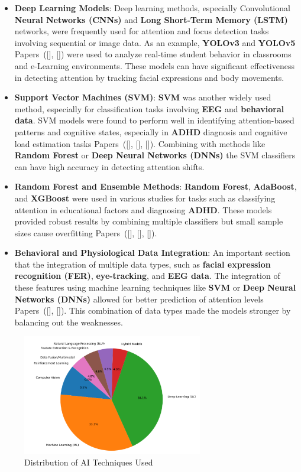 \documentclass[12pt]{article}
\begin{document}
\begin{itemize}
    \item \textbf{Deep Learning Models}: Deep learning methods, especially Convolutional \textbf{Neural Networks (CNNs)} and \textbf{Long Short-Term Memory (LSTM)} networks, were frequently used for attention and focus detection tasks involving sequential or image data. As an example, \textbf{YOLOv3} and \textbf{YOLOv5} Papers~([\citealp{ref1}], [\citealp{ref8}]) were used to analyze real-time student behavior in classrooms and e-Learning environments. These models can have significant effectiveness in detecting attention by tracking facial expressions and body movements.
    \item \textbf{Support Vector Machines (SVM)}: \textbf{SVM} was another widely used method, especially for classification tasks involving \textbf{EEG} and \textbf{behavioral data}. SVM models were found to perform well in identifying attention-based patterns and cognitive states, especially in \textbf{ADHD} diagnosis and cognitive load estimation tasks Papers~([\citealp{ref11}], [\citealp{ref12}], [\citealp{ref19}]). Combining with methods like \textbf{Random Forest} or \textbf{Deep Neural Networks (DNNs)} the SVM classifiers can have high accuracy in detecting attention shifts.
    \item \textbf{Random Forest and Ensemble Methods}: \textbf{Random Forest}, \textbf{AdaBoost}, and \textbf{XGBoost} were used in various studies for tasks such as classifying attention in educational factors and diagnosing \textbf{ADHD}. These models provided robust results by combining multiple classifiers but small sample sizes cause overfitting Papers~([\citealp{ref2}], [\citealp{ref13}], [\citealp{ref15}]).
    \item \textbf{Behavioral and Physiological Data Integration}: An important section that the integration of multiple data types, such as \textbf{facial expression recognition (FER)}, \textbf{eye-tracking}, and \textbf{EEG data}. The integration of these features using machine learning techniques like \textbf{SVM} or \textbf{Deep Neural Networks (DNNs)} allowed for better prediction of attention levels Papers~([\citealp{ref7}], [\citealp{ref16}]). This combination of data types made the models stronger by balancing out the weaknesses.
\end{itemize}

\begin{figure}[H]
\centering
\includegraphics[width=0.7\textwidth]{piechart.png}
\caption{Distribution of AI Techniques Used}
\end{figure}
\end{document}
